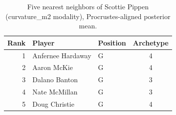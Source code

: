 \begin{table}[htbp]
  \centering\small
  \begin{tabular}{rllc}
    \toprule
    Rank & Player & Position & Archetype \\
    \midrule
    1 & Anfernee Hardaway & G & 4 \\
    2 & Aaron McKie & G & 4 \\
    3 & Dalano Banton & G & 3 \\
    4 & Nate McMillan & G & 3 \\
    5 & Doug Christie & G & 4 \\
    \bottomrule
  \end{tabular}
  \caption{Five nearest neighbors of Scottie Pippen (curvature_m2 modality), Procrustes-aligned posterior mean.}
  \label{tab:Scottie_Pippen_neighbors_curvature_m2}
\end{table}

